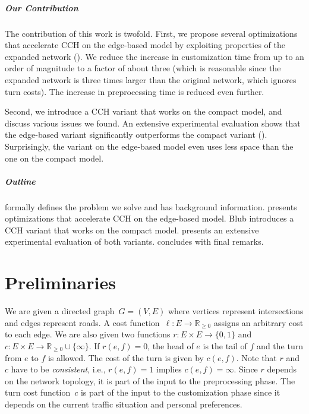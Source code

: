 \documentclass[a4paper, english, cleveref]{lipics-v2021}
\begin{document}
\subparagraph*{Our Contribution}

The contribution of this work is twofold. First, we propose several optimizations that accelerate CCH on the edge-based model by exploiting properties of the expanded network (). We reduce the increase in customization time from up to an order of magnitude to a factor of about three (which is reasonable since the expanded network is three times larger than the original network, which ignores turn costs). The increase in preprocessing time is reduced even further.

Second, we introduce a CCH variant that works on the compact model, and discuss various issues we found. An extensive experimental evaluation shows that the edge-based variant significantly outperforms the compact variant (). Surprisingly, the variant on the edge-based model even uses less space than the one on the compact model.

\subparagraph*{Outline}

 formally defines the problem we solve and has background information.  presents optimizations that accelerate CCH on the edge-based model.
Blub introduces a CCH variant that works on the compact model.  presents an extensive experimental evaluation of both variants.  concludes with final remarks.

\section{Preliminaries}
\label{sec:preliminaries}

We are given a directed graph~$G = (V, E)$ where vertices represent intersections and edges represent roads. A cost function~$\ell: E \to \mathbb{R}_{\ge 0}$ assigns an arbitrary cost to each edge. We are also given two functions $r: E \times E \to \{0, 1\}$ and $c: E \times E \to \mathbb{R}_{\ge 0} \cup \{\infty\}$. If $r(e, f) = 0$, the head of $e$ is the tail of $f$ and the turn from $e$ to $f$ is allowed. The cost of the turn is given by $c(e, f)$. Note that $r$ and $c$ have to be \emph{consistent}, i.e., $r(e, f) = 1$ implies $c(e, f) = \infty$. Since $r$ depends on the network topology, it is part of the input to the preprocessing phase. The turn cost function~$c$ is part of the input to the customization phase since it depends on the current traffic situation and personal preferences.
\end{document}
